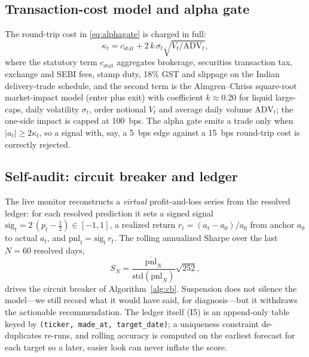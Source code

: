 \documentclass[conference]{IEEEtran}
\begin{document}
\subsection{Transaction-cost model and alpha gate}
\label{sec:cost}
The round-trip cost in \eqref{eq:alphagate} is charged in full:
\begin{equation}
\kappa_t = c_{\mathrm{stat}} + 2\,k\,\sigma_t\sqrt{V_t/\mathrm{ADV}_t},
\label{eq:cost}
\end{equation}
where the statutory term $c_{\mathrm{stat}}$ aggregates brokerage, securities
transaction tax, exchange and SEBI fees, stamp duty, 18\% GST and slippage on the
Indian delivery-trade schedule, and the second term is the Almgren--Chriss
square-root market-impact model \cite{almgren2001} (enter plus exit) with
coefficient
$k\approx0.20$ for liquid large-caps, daily volatility $\sigma_t$, order notional
$V_t$ and average daily volume $\mathrm{ADV}_t$; the one-side impact is capped at
100~bps. The alpha gate emits a trade only when $|a_t|\ge 2\kappa_t$, so a signal
with, say, a 5~bps edge against a 15~bps round-trip cost is correctly rejected.

\subsection{Self-audit: circuit breaker and ledger}
The live monitor reconstructs a \emph{virtual} profit-and-loss series from the
resolved ledger: for each resolved prediction it sets a signed signal
$\mathrm{sig}_t=2\,(p_t-\tfrac12)\in[-1,1]$, a realized return
$r_t=(a_t-a_0)/a_0$ from anchor $a_0$ to actual $a_t$, and
$\mathrm{pnl}_t=\mathrm{sig}_t\,r_t$. The rolling annualized Sharpe over the last
$N=60$ resolved days,
\begin{equation}
S_N=\frac{\overline{\mathrm{pnl}}_{N}}{\mathrm{std}(\mathrm{pnl}_{N})}\sqrt{252},
\label{eq:sharpe}
\end{equation}
drives the circuit breaker of Algorithm~\ref{alg:cb}. Suspension does not silence
the model---we still record what it would have said, for diagnosis---but it
withdraws the actionable recommendation. The ledger itself (I5) is an append-only
table keyed by \texttt{(ticker, made\_at, target\_date)}; a uniqueness constraint
de-duplicates re-runs, and rolling accuracy is computed on the earliest forecast
for each target so a later, easier look can never inflate the score.
\end{document}
